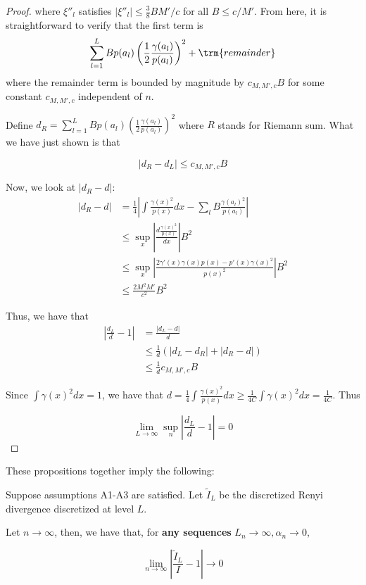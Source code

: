 \documentclass{article}
\begin{document}
\begin{proof}
where $\xi''_l$ satisfies $| \xi''_l | \leq \frac{3}{8} B M'/c$ for all $B \leq c / M'$. From here, it is straightforward to verify that the first term is 
\[
\sum_{l=1}^L Bp(a_l) \left( \frac{1}{2} \frac{\gamma(a_l)}{p(a_l)} \right)^2 + \trm{remainder}
\]
where the remainder term is bounded by magnitude by $c_{M, M', c}B$ for some constant $c_{M, M', c}$ independent of $n$. 

Define $d_R = \sum_{l=1}^L B p(a_l) \left( \frac{1}{2} \frac{\gamma(a_l)}{p(a_l)} \right)^2 $ where $R$ stands for Riemann sum. What we have just shown is that

\[
| d_R - d_L | \leq c_{M, M', c} B 
\]

Now, we look at $| d_R - d |$:
\begin{align*}
|d_R - d| &= \frac{1}{4} \left| \int \frac{\gamma(x)^2}{p(x)} dx - \sum_l B \frac{\gamma(a_l)^2}{p(a_l)} \right| \\
 &\leq \sup_x \left| \frac{ d \frac{\gamma(x)^2}{p(x)} }{dx} \right| B^2 \\
 &\leq \sup_x \left| \frac{ 2 \gamma'(x) \gamma(x) p(x) - p'(x) \gamma(x)^2 }{p(x)^2} \right| B^2 \\
 &\leq \frac{2 M^2 M' }{c^2} B^2 
\end{align*}

Thus, we have that
\begin{align*}
\left|\frac{d_L}{d} - 1 \right| &= \frac{| d_L - d |}{d} \\
  &\leq \frac{1}{d} \left( |d_L - d_R| + |d_R - d| \right) \\
  &\leq \frac{1}{d} c_{M, M', c} B 
\end{align*}

Since $\int \gamma(x)^2 dx = 1$, we have that $d = \frac{1}{4} \int \frac{\gamma(x)^2}{p(x)} dx \geq \frac{1}{4 C} \int \gamma(x)^2 dx = \frac{1}{4C}$. Thus

\[
\lim_{L \rightarrow \infty} \sup_n  \left| \frac{d_L}{d} - 1 \right| = 0
\]
 
\end{proof}


These propositions together imply the following:
\begin{shaded}
\begin{theorem}
\label{thm:relative_convergence_discrete_continuous_renyi}
Suppose assumptions A1-A3 are satisfied. Let $\tilde{I}_L$ be the discretized Renyi divergence discretized at level $L$.

Let $n \rightarrow \infty$, then, we have that, for \textbf{any sequences} $L_n \rightarrow \infty, \alpha_n \rightarrow 0$,

\[
\lim_{n \rightarrow \infty} \left| \frac{\tilde{I}_L}{I} - 1 \right| \rightarrow 0
\]

\end{theorem}
\end{shaded}
\end{document}
